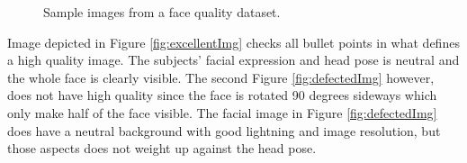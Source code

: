 \begin{figure}[h]
\centering
    \caption{Sample images from a face quality dataset.}
\end{figure}
%
Image depicted in Figure \ref{fig:excellentImg} checks all bullet points in what defines a high quality image. The subjects' facial expression and head pose is neutral and the whole face is clearly visible. The second Figure \ref{fig:defectedImg} however, does not have high quality since the face is rotated 90 degrees sideways which only make half of the face visible. The facial image  in Figure \ref{fig:defectedImg} does have a neutral background with good lightning and image resolution, but those aspects does not weight up against the head pose.
